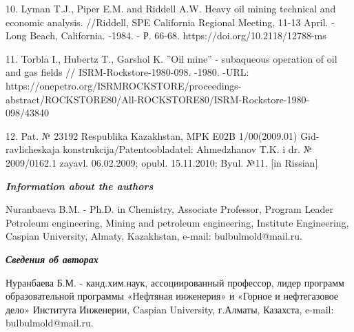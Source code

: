 \begin{noparindent}
10. Lyman T.J., Piper E.M. and Riddell A.W. Heavy oil mining technical
and economic analysis. //Riddell, SPE California Regional Meeting, 11-13
April. - Long Beach, California. -1984. - Р. 66-68.
https://doi.org/10.2118/12788-ms

11. Torbla I., Hubertz T., Garshol K. ''Oil mine'' - subaqueous
operation of oil and gas fields // ISRM-Rockstore-1980-098. -1980. -URL:
https://onepetro.org/ISRMROCKSTORE/proceedings-abstract/ROCKSTORE80/All-ROCKSTORE80/ISRM-Rockstore-1980-098/43840

12. Pat. № 23192 Respublika Kazakhstan, MPK E02B 1/00(2009.01)
Gid-ravlicheskaja konstrukcija/Patentoobladatel\textquotesingle:
Ahmedzhanov T.K. i dr. № 2009/0162.1 zayavl. 06.02.2009; opubl.
15.11.2010; Byul. №11. {[}in Rissian{]}
\end{noparindent}

\emph{{\bfseries Information about the authors}}

\begin{noparindent}
Nuranbaeva B.M. - Ph.D. in Chemistry, Associate Professor, Program
Leader Petroleum engineering, Mining and petroleum engineering,
Institute Engineering, Caspian University, Almaty, Kazakhstan, e-mail:
bulbulmold@mail.ru.
\end{noparindent}

\emph{{\bfseries Сведения об авторах}}

\begin{noparindent}
Нуранбаева Б.М. - канд.хим.наук, ассоциированный профессор, лидер
программ образовательной программы «Нефтяная инженерия» и «Горное и
нефтегазовое дело» Института Инженерии, Caspian University, г.Алматы,
Казахста, e-mail: bulbulmold@mail.ru.
\end{noparindent}
